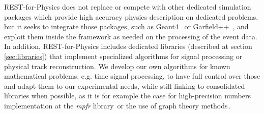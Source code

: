 REST-for-Physics does not replace or compete with other dedicated simulation packages which provide high accuracy physics description on dedicated problems, but it seeks to integrate those packages, such as Geant4~\cite{Agostinelli:2002hh} or Garfield++~\cite{Garfield}, and exploit them inside the framework as needed on the processing of the event data. In addition, REST-for-Physics includes dedicated libraries (described at section\,\ref{sec:libraries}) that implement specialized algorithms for signal processing or physical track reconstruction. We develop our own algorithms for known mathematical problems, e.g. time signal processing, to have full control over those  and adapt them to our experimental needs, while still linking to consolidated libraries when possible, as it is for example the case for high-precision numbers implementation at the \emph{mpfr} library\,\cite{10.1145/1236463.1236468} or the use of graph theory methods\,\cite{Applegate:2007:TSP:1374811,concorde}.